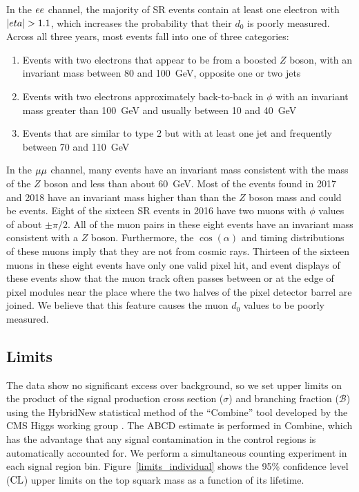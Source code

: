 In the $ee$ channel, the majority of SR events contain at least one electron with $\lvert eta \rvert > 1.1$, which increases the probability that their $d_0$ is poorly measured. Across all three years, most events fall into one of three categories: 
\begin{enumerate}
    \item Events with two electrons that appear to be from a boosted $Z$ boson, with an invariant mass between \num{80} and \SI{100}{\GeV}, opposite one or two jets
    \item Events with two electrons approximately back-to-back in $\phi$ with an invariant mass greater than \SI{100}{\GeV} and \ptmiss usually between \num{10} and \SI{40}{\GeV}
    \item Events that are similar to type 2 but with at least one jet and frequently \ptmiss between \num{70} and \SI{110}{\GeV}
\end{enumerate}

In the ${\mu}{\mu}$ channel, many events have an invariant mass consistent with the mass of the $Z$ boson and \ptmiss less than about \SI{60}{\GeV}. Most of the events found in 2017 and 2018 have an invariant mass higher than than the $Z$ boson mass and could be \ttbar events. Eight of the sixteen SR events in 2016 have two muons with $\phi$ values of about $\pm\pi/2$. All of the muon pairs in these eight events have an invariant mass consistent with a $Z$ boson. Furthermore, the $\cos(\alpha)$ and timing distributions of these muons imply that they are not from cosmic rays. Thirteen of the sixteen muons in these eight events have only one valid pixel hit, and event displays of these events show that the muon track often passes between or at the edge of pixel modules near the place where the two halves of the pixel detector barrel are joined. We believe that this feature causes the muon $d_0$ values to be poorly measured. 

\subsection{Limits}

The data show no significant excess over background, so we set upper limits on the product of the signal production cross section ($\sigma$) and branching fraction ($\mathcal{B}$) using the HybridNew statistical method of the ``Combine'' tool developed by the CMS Higgs working group \cite{Junk_CLS,Read_CLS,Cowan:2010js,CMS-NOTE-2011-005}. The ABCD estimate is performed in Combine, which has the advantage that any signal contamination in the control regions is automatically accounted for. We perform a simultaneous counting experiment in each signal region bin. Figure~\ref{limits_individual} shows the 95\% confidence level ($\text{CL}$) upper limits on the top squark mass as a function of its lifetime.

